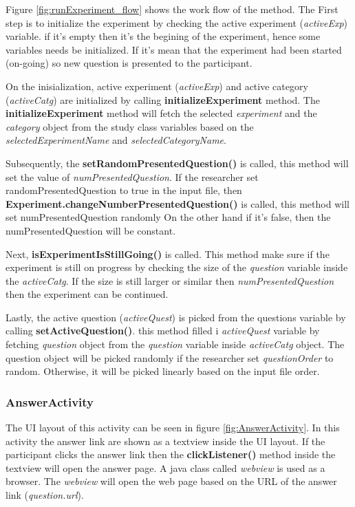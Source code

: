 Figure \ref{fig:runExperiment_flow} shows the work flow of the method. The First step is to initialize the experiment by checking the active experiment (\textit{activeExp}) variable.
 if it's empty then it's the begining of the experiment, hence some variables needs be initialized. If it's mean that the experiment had been started (on-going)
 so new question is presented to the participant.


On the inisialization, active experiment (\textit{activeExp}) and active category (\textit{activeCatg}) are initialized by calling \textbf{initializeExperiment} method.
The \textbf{initializeExperiment} method will fetch the selected \textit{experiment} and the
\textit{category} object from the study class variables based on the \textit{selectedExperimentName} and \textit{selectedCategoryName}.


Subsequently, the \textbf{setRandomPresentedQuestion()} is called, this method will set the value of \textit{numPresentedQuestion}.
If the researcher set randomPresentedQuestion to true in the input file, then \textbf{Experiment.changeNumberPresentedQuestion()} is called, this method will set numPresentedQuestion randomly
On the other hand if it's false, then the numPresentedQuestion will be constant.

Next, \textbf{isExperimentIsStillGoing()} is called. This method make sure if the experiment is still on progress by checking the size of the
\textit{question} variable inside the \textit{activeCatg}. If the size is still larger or similar then \textit{numPresentedQuestion} then the experiment can be continued.

Lastly, the active question (\textit{activeQuest}) is picked from the questions variable by calling \textbf{setActiveQuestion()}. this method filled
 i \textit{activeQuest} variable by fetching \textit{question} object from the \textit{question} variable inside \textit{activeCatg} object.
  The question object will be picked randomly if the researcher set \textit{questionOrder} to random. Otherwise, it will be picked linearly based on
  the input file order.


\subsubsection{AnswerActivity}
The UI layout of this activity can be seen in figure \ref{fig:AnswerActivity}.
In this activity the answer link are shown as a textview inside the UI layout. If the participant clicks the answer
link then the \textbf{clickListener()} method inside the textview will open the answer page.
A java class called \textit{webview} is used as a browser. The \textit{webview} will open the web page based on the URL of the answer link (\textit{question.url}).

